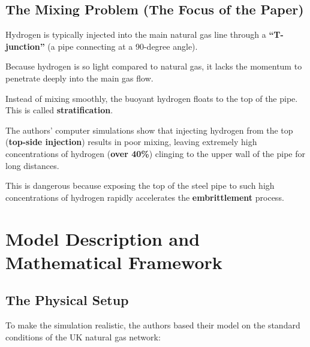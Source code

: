 \documentclass[12pt,a4paper]{report}
\begin{document}
\subsection{The Mixing Problem (The Focus of the Paper)}

Hydrogen is typically injected into the main natural gas line through a \textbf{``T-junction''} (a pipe connecting at a 90-degree angle).

Because hydrogen is so light compared to natural gas, it lacks the momentum to penetrate deeply into the main gas flow.

Instead of mixing smoothly, the buoyant hydrogen floats to the top of the pipe. This is called \textbf{stratification}.

The authors' computer simulations show that injecting hydrogen from the top (\textbf{top-side injection}) results in poor mixing, leaving extremely high concentrations of hydrogen (\textbf{over 40\%}) clinging to the upper wall of the pipe for long distances.

This is dangerous because exposing the top of the steel pipe to such high concentrations of hydrogen rapidly accelerates the \textbf{embrittlement} process.

\medskip
\noindent{}


\section{Model Description and Mathematical Framework}

\subsection{The Physical Setup}

To make the simulation realistic, the authors based their model on the standard conditions of the UK natural gas network:
\end{document}
